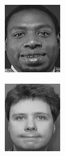 \begin{frame}
\begin{columns}
\begin{overlayarea}{\textwidth}{\textheight}
\begin{minipage}[t]{0.15\textwidth}
        \includegraphics[width=\textwidth]{images/celebrity_images/s22_1.jpg}
      \end{minipage}
      \begin{minipage}[t]{0.15\textwidth}
        \includegraphics[width=\textwidth]{images/celebrity_images/s23_1.jpg}

\end{minipage}
\end{overlayarea}
\end{columns}
\end{frame}
